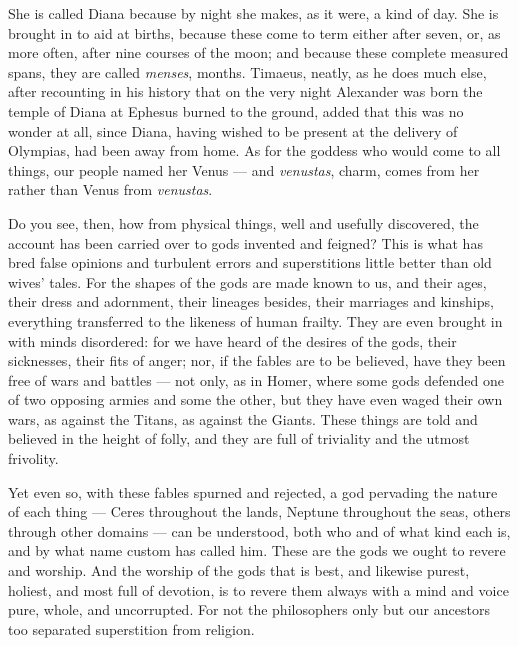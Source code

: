  She is called Diana because by night she makes, as it were, a kind of day. She is brought in to aid at births, because these come to term either after seven, or, as more often, after nine courses of the moon; and because these complete measured spans, they are called \textit{menses}, months. Timaeus, neatly, as he does much else, after recounting in his history that on the very night Alexander was born the temple of Diana at Ephesus burned to the ground, added that this was no wonder at all, since Diana, having wished to be present at the delivery of Olympias, had been away from home. As for the goddess who would come to all things, our people named her Venus --- and \textit{venustas}, charm, comes from her rather than Venus from \textit{venustas}.

 Do you see, then, how from physical things, well and usefully discovered, the account has been carried over to gods invented and feigned? This is what has bred false opinions and turbulent errors and superstitions little better than old wives' tales. For the shapes of the gods are made known to us, and their ages, their dress and adornment, their lineages besides, their marriages and kinships, everything transferred to the likeness of human frailty. They are even brought in with minds disordered: for we have heard of the desires of the gods, their sicknesses, their fits of anger; nor, if the fables are to be believed, have they been free of wars and battles --- not only, as in Homer, where some gods defended one of two opposing armies and some the other, but they have even waged their own wars, as against the Titans, as against the Giants. These things are told and believed in the height of folly, and they are full of triviality and the utmost frivolity.

 Yet even so, with these fables spurned and rejected, a god pervading the nature of each thing --- Ceres throughout the lands, Neptune throughout the seas, others through other domains --- can be understood, both who and of what kind each is, and by what name custom has called him. These are the gods we ought to revere and worship. And the worship of the gods that is best, and likewise purest, holiest, and most full of devotion, is to revere them always with a mind and voice pure, whole, and uncorrupted. For not the philosophers only but our ancestors too separated superstition from religion.

